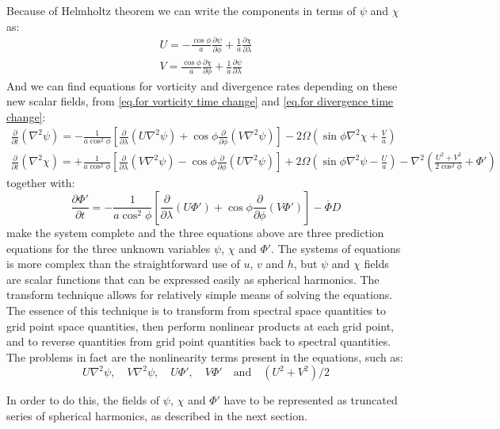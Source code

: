 Because of Helmholtz theorem we can write the components in terms of $\psi$ and $\chi$ as:
\begin{align}\label{eq.components helmholtz}
    U=-\frac{\cos\phi}{a}\frac{\partial\psi}{\partial\phi}+\frac{1}{a}\frac{\partial\chi}{\partial\lambda}\\
    V=\frac{\cos\phi}{a}\frac{\partial\chi}{\partial\phi}+\frac{1}{a}\frac{\partial\psi}{\partial\lambda}
\end{align}
And we can find equations for vorticity and divergence rates depending on these new scalar fields, from \ref{eq.for vorticity time change} and \ref{eq.for divergence time change}: 
\begin{align}\label{eq.motionforstreamf}
    \frac{\partial}{\partial t}(\nabla^2\psi)=-\frac{1}{a\cos^2\phi}\left[\frac{\partial}{\partial\lambda}(U\nabla^2\psi)+\cos\phi\frac{\partial}{\partial\phi}(V\nabla^2\psi)\right]-2\Omega\left(\sin\phi\nabla^2\chi+\frac{V}{a}\right)\\
     \frac{\partial}{\partial t}(\nabla^2\chi)=+\frac{1}{a\cos^2\phi}\left[\frac{\partial}{\partial\lambda}(V\nabla^2\psi)-\cos\phi\frac{\partial}{\partial\phi}(U\nabla^2\psi)\right]+2\Omega\left(\sin\phi\nabla^2\psi-\frac{U}{a}\right)-\nabla^2\left(\frac{U^2+V^2}{2\cos^2\phi}+\Phi'\right)
\end{align}
together with: 
\begin{equation}\label{eq.geostream}
    \frac{\partial\Phi'}{\partial t}=-\frac{1}{a\cos^2\phi}\left[\frac{\partial}{\partial\lambda}(U\Phi')+\cos\phi\frac{\partial}{\partial\phi}(V\Phi')\right]-\overline{\Phi}D
\end{equation}
make the system complete and the three equations above are three prediction equations for the three unknown variables $\psi$, $\chi$ and $\Phi'$. The systems of equations is more complex than the straightforward use of $u$, $v$ and $h$, but $\psi$ and $\chi$ fields are scalar functions that can be expressed easily as spherical harmonics.
The transform technique allows for relatively simple means of solving the equations. The essence of this technique is to transform from spectral space quantities to grid point space quantities, then perform nonlinear products at each grid point, and to reverse quantities from grid point quantities back to spectral quantities. The problems in fact are the nonlinearity terms present in the equations, such as: 
$$U\nabla^2\psi,\quad V\nabla^2\psi,\quad U\Phi',\quad V\Phi'\quad \text{and}\quad (U^2+V^2)/2$$

In order to do this, the fields of $\psi$, $\chi$ and $\Phi'$ have to be represented as truncated series of spherical harmonics, as described in the next section.

